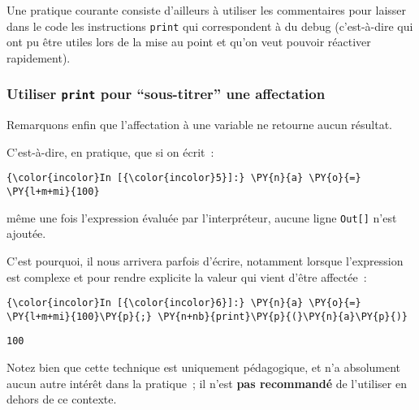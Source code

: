     Une pratique courante consiste d'ailleurs à utiliser les commentaires
pour laisser dans le code les instructions \texttt{print} qui
correspondent à du debug (c'est-à-dire qui ont pu être utiles lors de la
mise au point et qu'on veut pouvoir réactiver rapidement).

    \hypertarget{utiliser-print-pour-sous-titrer-une-affectation}{%
\subsubsection{\texorpdfstring{Utiliser \texttt{print} pour
``sous-titrer'' une
affectation}{Utiliser print pour ``sous-titrer'' une affectation}}\label{utiliser-print-pour-sous-titrer-une-affectation}}

    Remarquons enfin que l'affectation à une variable ne retourne aucun
résultat.

C'est-à-dire, en pratique, que si on écrit~:

    \begin{Verbatim}[commandchars=\\\{\}]
{\color{incolor}In [{\color{incolor}5}]:} \PY{n}{a} \PY{o}{=} \PY{l+m+mi}{100}
\end{Verbatim}


    même une fois l'expression évaluée par l'interpréteur, aucune ligne
\texttt{Out{[}{]}} n'est ajoutée.

    C'est pourquoi, il nous arrivera parfois d'écrire, notamment lorsque
l'expression est complexe et pour rendre explicite la valeur qui vient
d'être affectée~:

    \begin{Verbatim}[commandchars=\\\{\}]
{\color{incolor}In [{\color{incolor}6}]:} \PY{n}{a} \PY{o}{=} \PY{l+m+mi}{100}\PY{p}{;} \PY{n+nb}{print}\PY{p}{(}\PY{n}{a}\PY{p}{)}
\end{Verbatim}


    \begin{Verbatim}[commandchars=\\\{\}]
100

    \end{Verbatim}

    Notez bien que cette technique est uniquement pédagogique, et n'a
absolument aucun autre intérêt dans la pratique~; il n'est \textbf{pas
recommandé} de l'utiliser en dehors de ce contexte.


    
    
    
